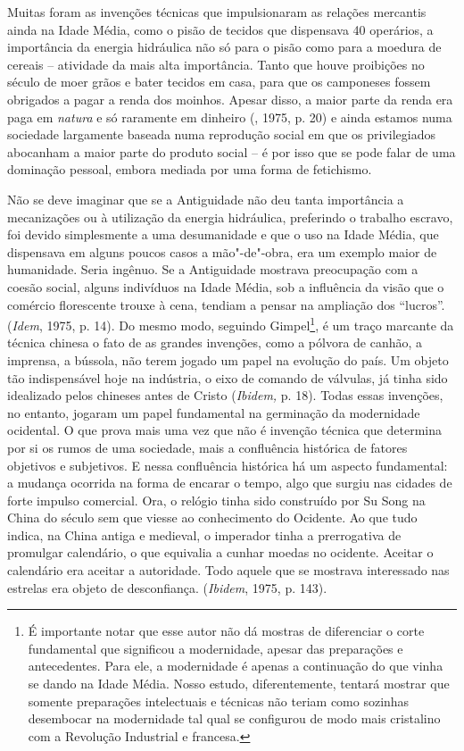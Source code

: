 Muitas foram as invenções técnicas que impulsionaram as relações
mercantis ainda na Idade Média, como o pisão de tecidos que dispensava
40 operários, a importância da energia hidráulica não só para o pisão
como para a moedura de cereais -- atividade da mais alta importância.
Tanto que houve proibições no século  de moer grãos e bater tecidos
em casa, para que os camponeses fossem obrigados a pagar a renda dos
moinhos. Apesar disso, a maior parte da renda era paga em \emph{natura}
e só raramente em dinheiro (, 1975, p. 20) e ainda estamos numa
sociedade largamente baseada numa reprodução social em que os
privilegiados abocanham a maior parte do produto social -- é por isso
que se pode falar de uma dominação pessoal, embora mediada por uma forma
de fetichismo.

Não se deve imaginar que se a Antiguidade não deu tanta importância a
mecanizações ou à utilização da energia hidráulica, preferindo o
trabalho escravo, foi devido simplesmente a uma desumanidade e que o uso
na Idade Média, que dispensava em alguns poucos casos a mão"-de"-obra, era
um exemplo maior de humanidade. Seria ingênuo. Se a Antiguidade mostrava
preocupação com a coesão social, alguns indivíduos na Idade Média, sob a
influência da visão que o comércio florescente trouxe à cena, tendiam a
pensar na ampliação dos ``lucros''. (\emph{Idem}, 1975, p. 14). Do mesmo
modo, seguindo Gimpel\footnote{É importante notar que esse autor não dá
  mostras de diferenciar o corte fundamental que significou a
  modernidade, apesar das preparações e antecedentes. Para ele, a
  modernidade é apenas a continuação do que vinha se dando na Idade
  Média. Nosso estudo, diferentemente, tentará mostrar que somente
  preparações intelectuais e técnicas não teriam como sozinhas
  desembocar na modernidade tal qual se configurou de modo mais
  cristalino com a Revolução Industrial e francesa.}, é um traço
marcante da técnica chinesa o fato de as grandes invenções, como a
pólvora de canhão, a imprensa, a bússola, não terem jogado um papel na
evolução do país. Um objeto tão indispensável hoje na indústria, o eixo
de comando de válvulas, já tinha sido idealizado pelos chineses antes de
Cristo (\emph{Ibidem,} p. 18). Todas essas invenções, no entanto,
jogaram um papel fundamental na germinação da modernidade ocidental. O
que prova mais uma vez que não é invenção técnica que determina por si
os rumos de uma sociedade, mais a confluência histórica de fatores
objetivos e subjetivos. E nessa confluência histórica há um aspecto
fundamental: a mudança ocorrida na forma de encarar o tempo, algo que surgiu
nas cidades de forte impulso comercial. Ora, o relógio tinha sido
construído por Su Song na China do século  sem que viesse ao
conhecimento do Ocidente. Ao que tudo indica, na China antiga e
medieval, o imperador tinha a prerrogativa de promulgar calendário, o
que equivalia a cunhar moedas no ocidente. Aceitar o calendário era
aceitar a autoridade. Todo aquele que se mostrava interessado nas
estrelas era objeto de desconfiança. (\emph{Ibidem}, 1975, p. 143).

